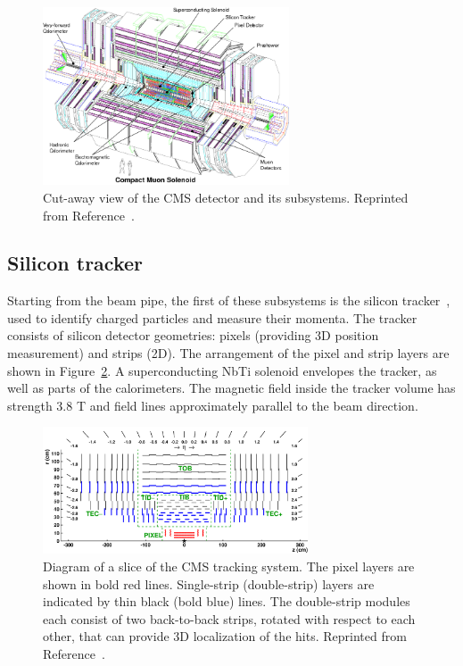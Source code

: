 \begin{figure}[]
    \begin{center}
        \includegraphics[width=0.65\textwidth]{figures/cms/cms.png}
        \caption{Cut-away view of the CMS detector and its subsystems.
                 Reprinted from Reference~\cite{cmsjinst}.}
        \label{fig:cms:cms}
    \end{center}
\end{figure}

\subsection{Silicon tracker}
\label{sec:cms:tracker}

Starting from the beam pipe, the first of these subsystems is the silicon tracker~\cite{cmstracker}, used to identify charged particles and measure their momenta. 
The tracker consists of silicon detector geometries: pixels (providing 3D position measurement) and strips (2D). 
The arrangement of the pixel and strip layers are shown in Figure~\ref{fig:cms:si}.
A superconducting NbTi solenoid envelopes the tracker, as well as parts of the calorimeters. 
The magnetic field inside the tracker volume has strength 3.8 T and field lines approximately parallel to the beam direction. 

\begin{figure}[]
    \begin{center} 
        \includegraphics[width=0.7\textwidth]{figures/cms/tracker.png}
        \caption{Diagram of a slice of the CMS tracking system.
                 The pixel layers are shown in bold red lines.
                 Single-strip (double-strip) layers are indicated by thin black (bold blue) lines.
                 The double-strip modules each consist of two back-to-back strips, rotated with respect to each other, that can provide 3D localization of the hits.
                 Reprinted from Reference~\cite{cmstracker}.}
        \label{fig:cms:si}
    \end{center}
\end{figure}


